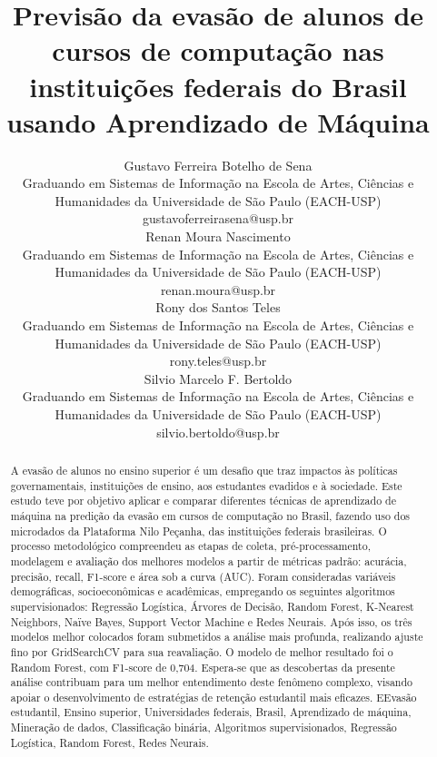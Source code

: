 \documentclass[english, spanish, brazilian]{RBIEarticle} %
\title{Previsão da evasão de alunos de cursos de computação nas instituições federais do Brasil usando Aprendizado de Máquina}
\author{%
	\parbox{8cm}{%
		Gustavo Ferreira Botelho de Sena\\
		Graduando em Sistemas de Informação na Escola de Artes, Ciências e Humanidades da Universidade de São Paulo (EACH-USP) \\
		gustavoferreirasena@usp.br
	}
    \vspace{1cm}
    \quad
	\parbox{8cm}{%
		Renan Moura Nascimento\\
		Graduando em Sistemas de Informação na Escola de Artes, Ciências e Humanidades da Universidade de São Paulo (EACH-USP) \\
		renan.moura@usp.br
	}
        \newline
        \parbox{8cm}{%
		Rony dos Santos Teles\\
		Graduando em Sistemas de Informação na Escola de Artes, Ciências e Humanidades da Universidade de São Paulo (EACH-USP) \\
		rony.teles@usp.br
	}
        \quad
        \vspace{1cm}
        \parbox{8cm}{%
		Silvio Marcelo F. Bertoldo\\
		Graduando em Sistemas de Informação na Escola de Artes, Ciências e Humanidades da Universidade de São Paulo (EACH-USP) \\
		silvio.bertoldo@usp.br
	}
}
\begin{document}
\maketitle

\begin{otherlanguage}{brazilian}
\begin{abstract}
A evasão de alunos no ensino superior é um desafio que traz impactos às políticas governamentais, instituições de ensino, aos estudantes evadidos e à sociedade. Este estudo teve por objetivo aplicar e comparar diferentes técnicas de aprendizado de máquina na predição da evasão em cursos de computação no Brasil, fazendo uso dos microdados da Plataforma Nilo Peçanha, das instituições federais brasileiras. O processo metodológico compreendeu as etapas de coleta, pré-processamento, modelagem e avaliação dos melhores modelos a partir de métricas padrão: acurácia, precisão, recall, F1-score e área sob a curva (AUC). Foram consideradas variáveis demográficas, socioeconômicas e acadêmicas, empregando os seguintes algoritmos supervisionados: Regressão Logística, Árvores de Decisão, Random Forest, K-Nearest Neighbors, Naïve Bayes, Support Vector Machine e Redes Neurais. Após isso, os três modelos melhor colocados foram submetidos a análise mais profunda, realizando ajuste fino por GridSearchCV para sua reavaliação. O modelo de melhor resultado foi o Random Forest, com F1-score de 0,704. Espera-se que as descobertas da presente análise contribuam para um melhor entendimento deste fenômeno complexo, visando apoiar o desenvolvimento de estratégias de retenção estudantil mais eficazes.
\keywords EEvasão estudantil, Ensino superior, Universidades federais, Brasil, Aprendizado de máquina, Mineração de dados, Classificação binária, Algoritmos supervisionados, Regressão Logística, Random Forest, Redes Neurais.
\end{abstract}
\end{otherlanguage}
\end{document}
